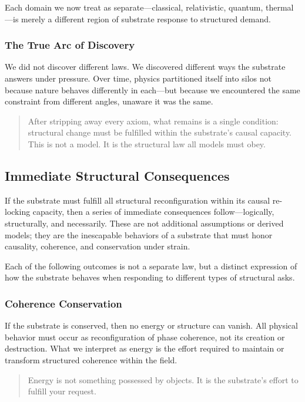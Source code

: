 \documentclass[entropy,article,submit,pdftex,moreauthors]{Definitions/mdpi}
\begin{document}
Each domain we now treat as separate—classical, relativistic, quantum, thermal—is merely a different region of substrate response to structured demand.

\subsubsection*{The True Arc of Discovery}

We did not discover different laws. We discovered different ways the substrate answers under pressure. Over time, physics partitioned itself into silos not because nature behaves differently in each—but because we encountered the same constraint from different angles, unaware it was the same.

\begin{quote}
After stripping away every axiom, what remains is a single condition: structural change must be fulfilled within the substrate’s causal capacity. This is not a model. It is the structural law all models must obey.
\end{quote}
\subsection{Immediate Structural Consequences}

If the substrate must fulfill all structural reconfiguration within its causal re-locking capacity, then a series of immediate consequences follow—logically, structurally, and necessarily. These are not additional assumptions or derived models; they are the inescapable behaviors of a substrate that must honor causality, coherence, and conservation under strain.

Each of the following outcomes is not a separate law, but a distinct expression of how the substrate behaves when responding to different types of structural asks.

\subsubsection{Coherence Conservation}

If the substrate is conserved, then no energy or structure can vanish. All physical behavior must occur as reconfiguration of phase coherence, not its creation or destruction. What we interpret as energy is the effort required to maintain or transform structured coherence within the field.

\begin{quote}
Energy is not something possessed by objects. It is the substrate’s effort to fulfill your request.
\end{quote}
\end{document}
